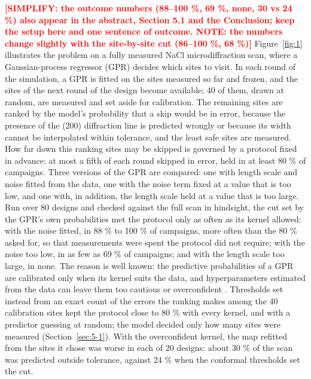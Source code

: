 \documentclass{iopjournal}
\newcommand{\ask}[1]{\textcolor{red}{\textbf{[#1]}}}
\begin{document}
\ask{SIMPLIFY: the outcome numbers (88--100 \%, 69 \%, none, 30 vs 24 \%) also appear in the abstract, Section 5.1 and the Conclusion; keep the setup here and one sentence of outcome. NOTE: the numbers change slightly with the site-by-site cut (86--100 \%, 68 \%)} Figure~\ref{fig:1} illustrates the problem on a fully measured NaCl microdiffraction scan, where a Gaussian-process regressor (GPR) decides which sites to visit. In each round of the simulation, a GPR is fitted on the sites measured so far and frozen, and the sites of the next round of the design become available; 40 of them, drawn at random, are measured and set aside for calibration. The remaining sites are ranked by the model's probability that a skip would be in error, because the presence of the (200) diffraction line is predicted wrongly or because its width cannot be interpolated within tolerance, and the least safe sites are measured. How far down this ranking sites may be skipped is governed by a protocol fixed in advance: at most a fifth of each round skipped in error, held in at least 80 \% of campaigns. Three versions of the GPR are compared: one with length scale and noise fitted from the data, one with the noise term fixed at a value that is too low, and one with, in addition, the length scale held at a value that is too large. Run over 80 designs and checked against the full scan in hindsight, the cut set by the GPR's own probabilities met the protocol only as often as its kernel allowed: with the noise fitted, in 88 \% to 100 \% of campaigns, more often than the 80 \% asked for, so that measurements were spent the protocol did not require; with the noise too low, in as few as 69 \% of campaigns; and with the length scale too large, in none. The reason is well known: the predictive probabilities of a GPR are calibrated only when its kernel suits the data, and hyperparameters estimated from the data can leave them too cautious or overconfident \cite{Karvonen2020}. Thresholds set instead from an exact count of the errors the ranking makes among the 40 calibration sites kept the protocol close to 80 \% with every kernel, and with a predictor guessing at random; the model decided only how many sites were measured (Section~\ref{sec:5-1}). With the overconfident kernel, the map refitted from the sites it chose was worse in each of 20 designs: about 30 \% of the scan was predicted outside tolerance, against 24 \% when the conformal thresholds set the cut.
\end{document}
